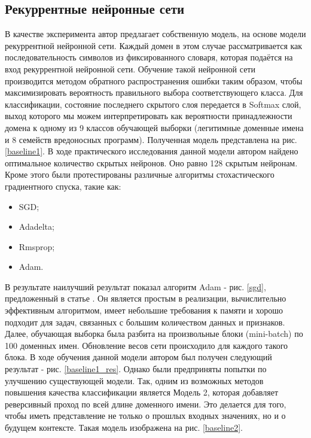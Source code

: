    \subsection{Рекуррентные нейронные сети}\label{lstm_class_exp}
    В качестве эксперимента автор предлагает собственную модель, на основе модели рекуррентной нейронной сети. Каждый домен в этом случае рассматривается как последовательность символов из фиксированного словаря, которая подаётся на вход рекуррентной нейронной сети. Обучение такой нейронной сети производится методом обратного распространения ошибки таким образом, чтобы максимизировать вероятность правильного выбора соответствующего класса. Для классификации, состояние последнего скрытого слоя передается в Softmax слой, выход которого мы можем интерпретировать как вероятности принадлежности домена к одному из 9 классов обучающей выборки (легитимные доменные имена и 8 семейств вредоносных программ). Полученная модель представлена на рис. \ref{baseline1}.
    В ходе практического исследования данной модели автором найдено оптимальное количество скрытых нейронов. Оно равно 128 скрытым нейронам.
    Кроме этого были протестированы различные алгоритмы стохастического градиентного спуска, такие как:
    \begin{itemize}
    \item SGD;
    \item Adadelta;
    \item Rmsprop;
    \item Adam.
    \end{itemize}
    В результате наилучший результат показал алгоритм Adam - рис. \ref{sgd}, предложенный в статье \cite{Diederik}. Он является простым в реализации, вычислительно эффективным алгоритмом, имеет небольшие требования к памяти и хорошо подходит для задач, связанных с большим количеством данных и признаков.
    Далее, обучающая выборка была разбита на произвольные блоки (mini-batch) по 100 доменных имен. Обновление весов сети происходило для каждого такого блока. В ходе обучения данной модели автором был получен следующий результат - рис. \ref{baseline1_res}.
    Однако были предприняты попытки по улучшению существующей модели. Так, одним из возможных методов повышения качества классификации является Модель 2, которая добавляет реверсивный проход по всей длине доменного имени. Это делается для того, чтобы иметь представление не только о прошлых входных значениях, но и о будущем контексте. Такая модель изображена на рис. \ref{baseline2}.
